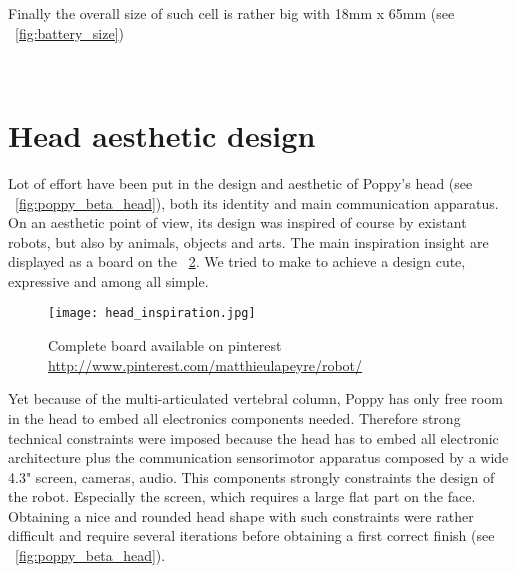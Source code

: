 Finally the overall size of such cell is rather big with 18mm x 65mm (see \figurename~\ref{fig:battery_size})

\begin{figure}[]
\centering
    \hfil
    \\
    \caption{}
    \label{fig:tyva_batteries}
\end{figure}





\section{Head aesthetic design} %

Lot of effort have been put in the design and aesthetic of Poppy's head (see \figurename~\ref{fig:poppy_beta_head}), both its identity and main communication apparatus.
On an aesthetic point of view, its design was inspired of course by existant robots, but also by animals, objects and arts. The main inspiration insight are displayed as a board on the \figurename~\ref{fig:head_inspiration}. We tried to make to achieve a design cute, expressive and among all simple.

\begin{figure}[p]
    \begin{center}
        \texttt{[image: head\_inspiration.jpg]}
    \end{center}
    \caption{Complete board available on pinterest \url{http://www.pinterest.com/matthieulapeyre/robot/}}
    \label{fig:head_inspiration}
\end{figure}

Yet because of the multi-articulated vertebral column, Poppy has only free room in the head to embed all electronics components needed. Therefore strong technical constraints were imposed because the head has to embed all electronic architecture plus the communication sensorimotor apparatus composed by a wide 4.3" screen, cameras, audio.
This components strongly constraints the design of the robot. Especially the screen, which requires a large flat part on the face. Obtaining a nice and rounded head shape with such constraints were rather difficult and require several iterations before obtaining a first correct finish (see \figurename~\ref{fig:poppy_beta_head}).

